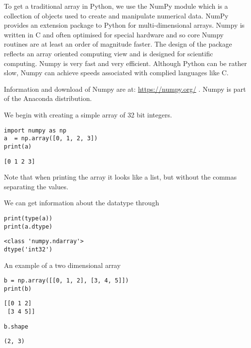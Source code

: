 To get a traditional array in Python, we use the NumPy module which is a
collection of objects used to create and manipulate numerical data.
NumPy provides an extension package to Python for multi-dimensional
arrays. Numpy is written in C and often optimised for special hardware
and so core Numpy routines are at least an order of magnitude faster.
The design of the package reflects an array oriented computing view and
is designed for scientific computing. Numpy is very fast and very
efficient. Although Python can be rather slow, Numpy can achieve speeds
associated with complied languages like C.

Information and download of Numpy are at: \url{https://numpy.org/} .
Numpy is part of the Anaconda distribution.

We begin with creating a simple array of 32 bit integers.

\begin{verbatim}
import numpy as np
a  = np.array([0, 1, 2, 3])
print(a)
\end{verbatim}

\begin{verbatim}
[0 1 2 3]
\end{verbatim}

Note that when printing the array it looks like a list, but without the
commas separating the values.

We can get information about the datatype through

\begin{verbatim}
print(type(a))
print(a.dtype)
\end{verbatim}

\begin{verbatim}
<class 'numpy.ndarray'>
dtype('int32')
\end{verbatim}

An example of a two dimensional array

\begin{verbatim}
b = np.array([[0, 1, 2], [3, 4, 5]])
print(b)
\end{verbatim}

\begin{verbatim}
[[0 1 2]
 [3 4 5]]
\end{verbatim}

\begin{verbatim}
b.shape
\end{verbatim}

\begin{verbatim}
(2, 3)
\end{verbatim}


